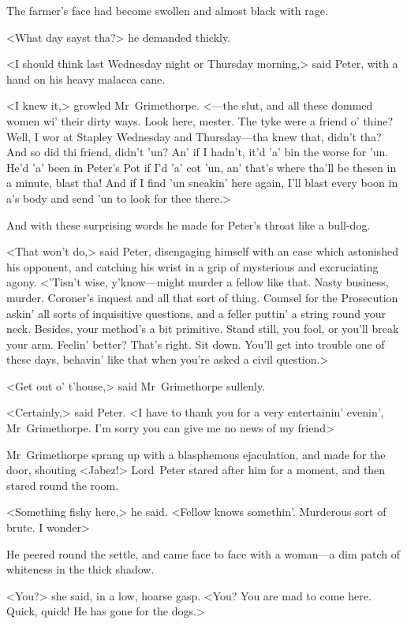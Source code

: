 The farmer's face had become swollen and almost black with rage.

<What day sayst tha?> he demanded thickly.

<I should think last Wednesday night or Thursday morning,> said Peter, with a hand on his heavy malacca cane.

<I knew it,> growled Mr~Grimethorpe. <—the slut, and all these dommed women wi' their dirty ways. Look here, mester. The tyke were a friend o' thine? Well, I wor at Stapley Wednesday and Thursday—tha knew that, didn't tha? And so did thi friend, didn't 'un? An' if I hadn't, it'd 'a' bin the worse for 'un. He'd 'a' been in Peter's Pot if I'd 'a' cot 'un, an' that's where tha'll be thesen in a minute, blast tha! And if I find 'un sneakin' here again, I'll blast every boon in a's body and send 'un to look for thee there.>

And with these surprising words he made for Peter's throat like a bull-dog.

<That won't do,> said Peter, disengaging himself with an ease which astonished his opponent, and catching his wrist in a grip of mysterious and excruciating agony. <'Tisn't wise, y'know—might murder a fellow like that. Nasty business, murder. Coroner's inquest and all that sort of thing. Counsel for the Prosecution askin' all sorts of inquisitive questions, and a feller puttin' a string round your neck. Besides, your method's a bit primitive. Stand still, you fool, or you'll break your arm. Feelin' better? That's right. Sit down. You'll get into trouble one of these days, behavin' like that when you're asked a civil question.>

<Get out o' t'house,> said Mr~Grimethorpe sullenly.

<Certainly,> said Peter. <I have to thank you for a very entertainin' evenin', Mr~Grimethorpe. I'm sorry you can give me no news of my friend\longdash>

Mr~Grimethorpe sprang up with a blasphemous ejaculation, and made for the door, shouting <Jabez!> Lord~Peter stared after him for a moment, and then stared round the room.

<Something fishy here,> he said. <Fellow knows somethin'. Murderous sort of brute. I wonder\longdash>

He peered round the settle, and came face to face with a woman—a dim patch of whiteness in the thick shadow.

<You?> she said, in a low, hoarse gasp. <You? You are mad to come here.  Quick, quick! He has gone for the dogs.>

